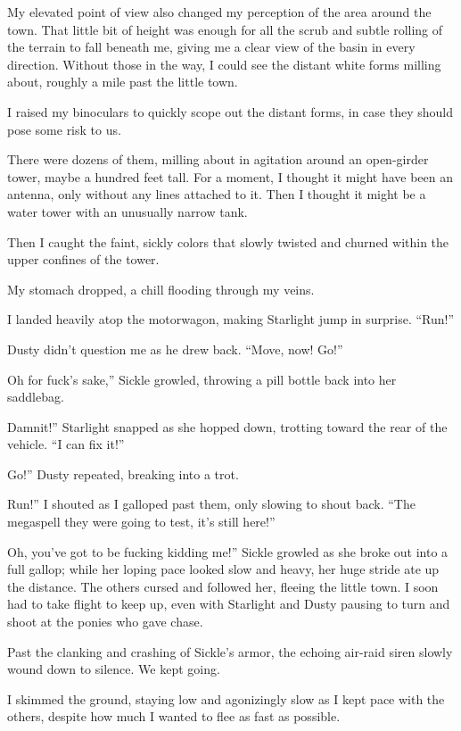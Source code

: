 My elevated point of view also changed my perception of the area around the town. That little bit of height was enough for all the scrub and subtle rolling of the terrain to fall beneath me, giving me a clear view of the basin in every direction. Without those in the way, I could see the distant white forms milling about, roughly a mile past the little town.

I raised my binoculars to quickly scope out the distant forms, in case they should pose some risk to us.

There were dozens of them, milling about in agitation around an open-girder tower, maybe a hundred feet tall. For a moment, I thought it might have been an antenna, only without any lines attached to it. Then I thought it might be a water tower with an unusually narrow tank.

Then I caught the faint, sickly colors that slowly twisted and churned within the upper confines of the tower.

My stomach dropped, a chill flooding through my veins.

I landed heavily atop the motorwagon, making Starlight jump in surprise. “Run!”

Dusty didn’t question me as he drew back. “Move, now! Go!”

\leavevmode{}Oh for fuck’s sake,” Sickle growled, throwing a pill bottle back into her saddlebag.

\leavevmode{}Damnit!” Starlight snapped as she hopped down, trotting toward the rear of the vehicle. “I can fix it!”

\leavevmode{}Go!” Dusty repeated, breaking into a trot.

\leavevmode{}Run!” I shouted as I galloped past them, only slowing to shout back. “The megaspell they were going to test, it’s still here!”

\leavevmode{}Oh, you’ve got to be fucking kidding me!” Sickle growled as she broke out into a full gallop; while her loping pace looked slow and heavy, her huge stride ate up the distance. The others cursed and followed her, fleeing the little town. I soon had to take flight to keep up, even with Starlight and Dusty pausing to turn and shoot at the ponies who gave chase.

Past the clanking and crashing of Sickle’s armor, the echoing air-raid siren slowly wound down to silence. We kept going.

I skimmed the ground, staying low and agonizingly slow as I kept pace with the others, despite how much I wanted to flee as fast as possible.

